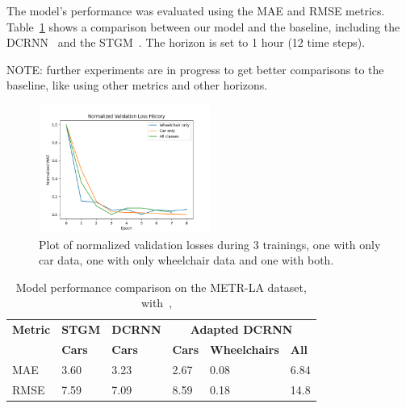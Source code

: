 The model's performance was evaluated using the MAE and RMSE metrics.
Table~\ref{tab:model_performance_comparison} shows a comparison between our model and the baseline, including the DCRNN~
\cite{DCRNN} and the STGM~\cite{LABLACK2023120281}.
The horizon is set to 1 hour (12 time steps).

NOTE: further experiments are in progress to get better comparisons to the baseline, like using other metrics and other
horizons.

\begin{figure}[htbp]
    \centering
    \includegraphics[width=0.5\textwidth]{images/normalized_val_losses}
    \caption{
        Plot of normalized validation losses during 3 trainings, one with only car data,
        one with only wheelchair data and one with both.
    }
    \label{fig:normalized_val_losses}
\end{figure}

\begin{table}[htbp]
    \caption{Model performance comparison on the METR-LA dataset, with~\cite{DCRNN},
        ~\cite{LABLACK2023120281}}
    \center
    \begin{tabular}{@{}llllll@{}}
        \toprule
        \textbf{Metric} & \textbf{STGM} & \textbf{DCRNN} & \multicolumn{3}{c}{\textbf{Adapted DCRNN}} \\
        & \textbf{Cars} & \textbf{Cars} & \textbf{Cars} & \textbf{Wheelchairs} & \textbf{All} \\
        \midrule
        MAE  & 3.60          & 3.23          & 2.67          & 0.08                 & 6.84         \\
        RMSE & 7.59          & 7.09          & 8.59          & 0.18                 & 14.8         \\
        \bottomrule
    \end{tabular}
    \label{tab:model_performance_comparison}
\end{table}